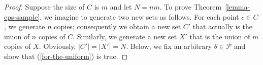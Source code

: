\documentclass{article}
\begin{document}
\begin{proof}
Suppose the size of $C$ is $m$ and let $N=nm$. To prove Theorem~\ref{lemma-eps-sample}, we imagine to generate two new sets as follows. For each point $c\in C$, we generate $n$ copies; consequently we obtain a new set $C'$ that actually is the union of $n$ copies of $C$. Similarly, we generate a new set $X'$ that is the union of $m$ copies of $X$. Obviously, $|C'|=|X'|=N$. Below, we fix an arbitrary $ \theta\in\mathcal{P} $ and show that (\ref{for-the-uniform}) is true. 


\end{proof}
\end{document}
